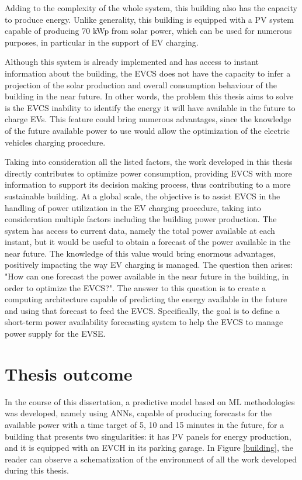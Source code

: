 Adding to the complexity of the whole system, this building also has the capacity to produce energy. Unlike generality, this building is equipped with a \ac{PV} system capable of producing 70 kWp from solar power, which can be used for numerous purposes, in particular in the support of \ac{EV} charging.


Although this system is already implemented and has access to instant information about the building, the \ac{EVCS} does not have the capacity to infer a projection of the solar production and overall consumption behaviour of the building in the near future. In other words, the problem this thesis aims to solve is the \ac{EVCS} inability to identify the energy it will have available in the future to charge \ac{EV}s. This feature could bring numerous advantages, since the knowledge of the future available power to use would allow the optimization of the electric vehicles charging procedure.


Taking into consideration all the listed factors, the work developed in this thesis directly contributes to optimize power consumption, providing \ac{EVCS} with more information to support its decision making process, thus contributing to a more sustainable building. At a global scale, the objective is to assist \ac{EVCS} in the handling of power utilization in the \ac{EV} charging procedure, taking into consideration multiple factors including the building power production. The system has access to current data, namely the total power available at each instant, but it would be useful to obtain a forecast of the power available in the near future. The knowledge of this value would bring enormous advantages, positively impacting the way \ac{EV} charging is managed. The question then arises: "How can one forecast the power available in the near future in the building, in order to optimize the \ac{EVCS}?". The answer to this question is to create a computing architecture capable of predicting the energy available in the future and using that forecast to feed the \ac{EVCS}. Specifically, the goal is to define a short-term power availability forecasting system to help the \ac{EVCS} to manage power supply for the \ac{EVSE}. 





\section{Thesis outcome}

In the course of this dissertation, a predictive model based on \ac{ML} methodologies was developed, namely using \ac{ANNs}, capable of producing forecasts for the available power with a time target of 5, 10 and 15 minutes in the future, for a building that presents two singularities: it has \acf{PV} panels for energy production, and it is equipped with an \ac{EVCH} in its parking garage. In Figure \ref{building}, the reader can observe a schematization of the environment of all the work developed during this thesis. 

